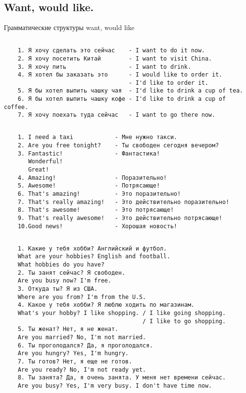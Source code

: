 \subsection{Want, would like.}
Грамматические структуры want, would like
\subsection*{}
\begin{verbatim}
    1. Я хочу сделать это сейчас    - I want to do it now.
    2. Я хочу посетить Китай        - I want to visit China.
    3. Я хочу пить                  - I want to drink.
    4. Я хотел бы заказать это      - I would like to order it.
                                    - I'd like to order it.
    5. Я бы хотел выпить чашку чая  - I'd like to drink a cup of tea.
    6. Я бы хотел выпить чашку кофе - I'd like to drink a cup of coffee.
    7. Я хочу поехать туда сейчас   - I want to go there now.
\end{verbatim}

\subsection*{}
\begin{verbatim}
    1. I need a taxi            - Мне нужно такси.
    2. Are you free tonight?    - Ты свободен сегодня вечером?
    3. Fantastic!               - Фантастика!
       Wonderful!
       Great!
    4. Amazing!                 - Поразительно!
    5. Awesome!                 - Потрясающе!
    6. That's amazing!          - Это поразительно!
    7. That's really amazing!   - Это действительно поразительно!
    8. That's awesome!          - Это потрясающе!
    9. That's really awesome!   - Это действительно потрясающе!
    10.Good news!               - Хорошая новость!
\end{verbatim}

\subsection*{}
\begin{verbatim}
    1. Какие у тебя хобби? Английский и футбол.
    What are your hobbies? English and football.
    What hobbies do you have?
    2. Ты занят сейчас? Я свободен.
    Are you busy now? I'm free.
    3. Откуда ты? Я из США.
    Where are you from? I'm from the U.S.
    4. Какое у тебя хобби? Я люблю ходить по магазинам.
    What's your hobby? I like shopping. / I like going shopping.
                                        / I like to go shopping.
    5. Ты женат? Нет, я не женат.
    Are you married? No, I'm not married.
    6. Ты проголодался? Да, я проголодался.
    Are you hungry? Yes, I'm hungry.
    7. Ты готов? Нет, я еще не готов.
    Are you ready? No, I'm not ready yet.
    8. Ты занята? Да, я очень занята. У меня нет времени сейчас.
    Are you busy? Yes, I'm very busy. I don't have time now.
\end{verbatim}

